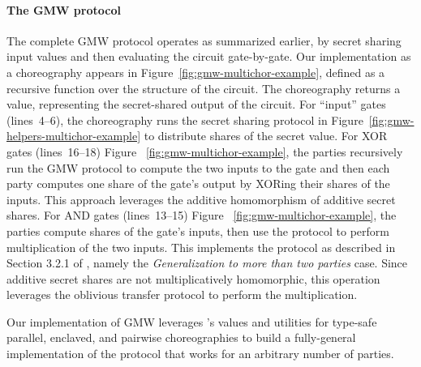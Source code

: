 \paragraph{The GMW protocol}
The complete GMW protocol operates as summarized earlier, by secret sharing input values and then evaluating the circuit gate-by-gate.
Our implementation as a \MultiChor choreography appears in Figure~\ref{fig:gmw-multichor-example},
defined as a recursive function over the structure of the circuit.
The choreography returns a  value, representing the secret-shared output of the circuit.
For ``input'' gates (lines~4--6), the choreography runs the secret sharing protocol in Figure~\ref{fig:gmw-helpers-multichor-example}
to distribute shares of the secret value.
For XOR gates (lines~16--18) Figure ~\ref{fig:gmw-multichor-example},
the parties recursively run the GMW protocol to compute the two inputs to the gate
and then each party computes one share of the gate's output by XORing their shares of the inputs.
This approach leverages the additive homomorphism of additive secret shares.
For AND gates (lines~13--15) Figure ~\ref{fig:gmw-multichor-example}, the parties compute shares of the gate's inputs,
then use the  protocol to perform multiplication of the two inputs.
This implements the protocol as described in  Section 3.2.1 of \cite{evans2018pragmatic},
namely the \emph{Generalization to more than two parties} case.
Since additive secret shares are not multiplicatively homomorphic,
this operation leverages the oblivious transfer protocol to perform the multiplication.

Our implementation of GMW leverages \MultiChor's  values
and utilities for type-safe parallel, enclaved, and pairwise choreographies to build a fully-general implementation
of the protocol that works for an arbitrary number of parties.



